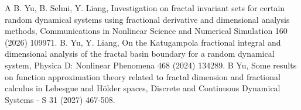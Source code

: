 \documentclass{amsproc}
\theoremstyle{definition}
\theoremstyle{remark}
\numberwithin{equation}{section}
\begin{document}
\begin{thebibliography}{A}
 B. Yu, B. Selmi, Y. Liang, Investigation on fractal invariant sets for certain random dynamical systems using fractional derivative and dimensional analysis methods, Communications in Nonlinear Science and Numerical Simulation 160 (2026) 109971. 
 B. Yu, Y. Liang, On the Katugampola fractional integral and dimensional analysis of the fractal basin boundary for a random dynamical system, Physica D: Nonlinear Phenomena 468 (2024) 134289.
 B Yu, Some results on function approximation theory related to fractal dimension and fractional calculus in Lebesgue and Hölder spaces, Discrete and Continuous Dynamical Systems - S 31 (2027) 467-508.




\end{thebibliography}
\end{document}
